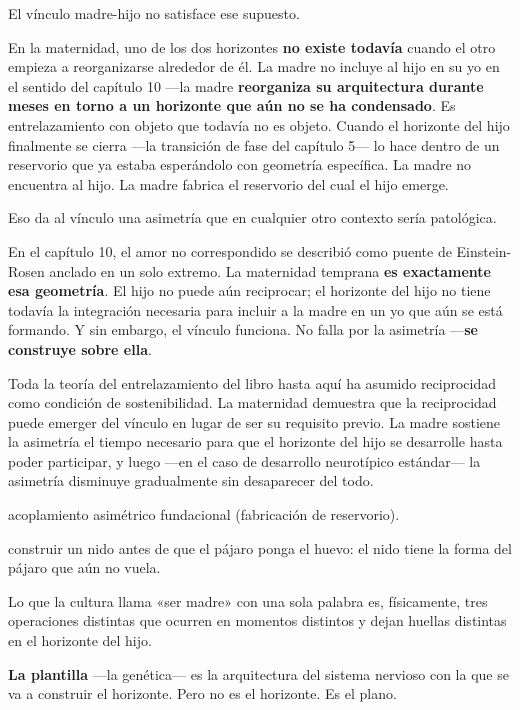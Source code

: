 El vínculo madre-hijo no satisface ese supuesto.

En la maternidad, uno de los dos horizontes \textbf{no existe todavía} cuando el otro empieza a reorganizarse alrededor de él. La madre no incluye al hijo en su yo en el sentido del capítulo 10 —la madre \textbf{reorganiza su arquitectura durante meses en torno a un horizonte que aún no se ha condensado}. Es entrelazamiento con objeto que todavía no es objeto. Cuando el horizonte del hijo finalmente se cierra —la transición de fase del capítulo 5— lo hace dentro de un reservorio que ya estaba esperándolo con geometría específica. La madre no encuentra al hijo. La madre fabrica el reservorio del cual el hijo emerge.

Eso da al vínculo una asimetría que en cualquier otro contexto sería patológica.

En el capítulo 10, el amor no correspondido se describió como puente de Einstein-Rosen anclado en un solo extremo. La maternidad temprana \textbf{es exactamente esa geometría}. El hijo no puede aún reciprocar; el horizonte del hijo no tiene todavía la integración necesaria para incluir a la madre en un yo que aún se está formando. Y sin embargo, el vínculo funciona. No falla por la asimetría —\textbf{se construye sobre ella}.

Toda la teoría del entrelazamiento del libro hasta aquí ha asumido reciprocidad como condición de sostenibilidad. La maternidad demuestra que la reciprocidad puede emerger del vínculo en lugar de ser su requisito previo. La madre sostiene la asimetría el tiempo necesario para que el horizonte del hijo se desarrolle hasta poder participar, y luego —en el caso de desarrollo neurotípico estándar— la asimetría disminuye gradualmente sin desaparecer del todo.

\begin{fisica}
 acoplamiento asimétrico fundacional (fabricación de reservorio).

 construir un nido antes de que el pájaro ponga el huevo: el nido tiene la forma del pájaro que aún no vuela.
\end{fisica}
\noindent Lo que la cultura llama «ser madre» con una sola palabra es, físicamente, tres operaciones distintas que ocurren en momentos distintos y dejan huellas distintas en el horizonte del hijo.

\textbf{La plantilla} —la genética— es la arquitectura del sistema nervioso con la que se va a construir el horizonte. Pero no es el horizonte. Es el plano.

